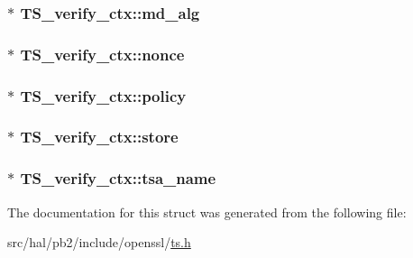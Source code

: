 \subsubsection[{\texorpdfstring{md\+\_\+alg}{md_alg}}]{$\ast$ T\+S\+\_\+verify\+\_\+ctx\+::md\+\_\+alg}\hypertarget{struct_t_s__verify__ctx_a1875de1fef64a6d896f228badbdd2ddf}{}\label{struct_t_s__verify__ctx_a1875de1fef64a6d896f228badbdd2ddf}
\subsubsection[{\texorpdfstring{nonce}{nonce}}]{$\ast$ T\+S\+\_\+verify\+\_\+ctx\+::nonce}\hypertarget{struct_t_s__verify__ctx_a3b3407367a1dd2b12053d527040b28a2}{}\label{struct_t_s__verify__ctx_a3b3407367a1dd2b12053d527040b28a2}
\subsubsection[{\texorpdfstring{policy}{policy}}]{$\ast$ T\+S\+\_\+verify\+\_\+ctx\+::policy}\hypertarget{struct_t_s__verify__ctx_ab433c7a76c0dd42e99eb654aa7c459fa}{}\label{struct_t_s__verify__ctx_ab433c7a76c0dd42e99eb654aa7c459fa}
\subsubsection[{\texorpdfstring{store}{store}}]{$\ast$ T\+S\+\_\+verify\+\_\+ctx\+::store}\hypertarget{struct_t_s__verify__ctx_a9aa523132a1fc3f0c6f5330b524e177f}{}\label{struct_t_s__verify__ctx_a9aa523132a1fc3f0c6f5330b524e177f}
\subsubsection[{\texorpdfstring{tsa\+\_\+name}{tsa_name}}]{$\ast$ T\+S\+\_\+verify\+\_\+ctx\+::tsa\+\_\+name}\hypertarget{struct_t_s__verify__ctx_aa41f4334c8821a67eca400e955957f57}{}\label{struct_t_s__verify__ctx_aa41f4334c8821a67eca400e955957f57}


The documentation for this struct was generated from the following file\+:\begin{DoxyCompactItemize}
\item 
src/hal/pb2/include/openssl/\hyperlink{ts_8h}{ts.\+h}\end{DoxyCompactItemize}

